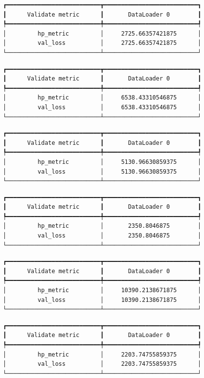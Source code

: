 \documentclass[
  letterpaper,
  DIV=11,
  numbers=noendperiod]{scrreprt}
\begin{document}
\begin{verbatim}
┏━━━━━━━━━━━━━━━━━━━━━━━━━━━┳━━━━━━━━━━━━━━━━━━━━━━━━━━━┓
┃      Validate metric      ┃       DataLoader 0        ┃
┡━━━━━━━━━━━━━━━━━━━━━━━━━━━╇━━━━━━━━━━━━━━━━━━━━━━━━━━━┩
│         hp_metric         │     2725.66357421875      │
│         val_loss          │     2725.66357421875      │
└───────────────────────────┴───────────────────────────┘
\end{verbatim}

\begin{verbatim}
┏━━━━━━━━━━━━━━━━━━━━━━━━━━━┳━━━━━━━━━━━━━━━━━━━━━━━━━━━┓
┃      Validate metric      ┃       DataLoader 0        ┃
┡━━━━━━━━━━━━━━━━━━━━━━━━━━━╇━━━━━━━━━━━━━━━━━━━━━━━━━━━┩
│         hp_metric         │     6538.43310546875      │
│         val_loss          │     6538.43310546875      │
└───────────────────────────┴───────────────────────────┘
\end{verbatim}

\begin{verbatim}
┏━━━━━━━━━━━━━━━━━━━━━━━━━━━┳━━━━━━━━━━━━━━━━━━━━━━━━━━━┓
┃      Validate metric      ┃       DataLoader 0        ┃
┡━━━━━━━━━━━━━━━━━━━━━━━━━━━╇━━━━━━━━━━━━━━━━━━━━━━━━━━━┩
│         hp_metric         │     5130.96630859375      │
│         val_loss          │     5130.96630859375      │
└───────────────────────────┴───────────────────────────┘
\end{verbatim}

\begin{verbatim}
┏━━━━━━━━━━━━━━━━━━━━━━━━━━━┳━━━━━━━━━━━━━━━━━━━━━━━━━━━┓
┃      Validate metric      ┃       DataLoader 0        ┃
┡━━━━━━━━━━━━━━━━━━━━━━━━━━━╇━━━━━━━━━━━━━━━━━━━━━━━━━━━┩
│         hp_metric         │       2350.8046875        │
│         val_loss          │       2350.8046875        │
└───────────────────────────┴───────────────────────────┘
\end{verbatim}

\begin{verbatim}
┏━━━━━━━━━━━━━━━━━━━━━━━━━━━┳━━━━━━━━━━━━━━━━━━━━━━━━━━━┓
┃      Validate metric      ┃       DataLoader 0        ┃
┡━━━━━━━━━━━━━━━━━━━━━━━━━━━╇━━━━━━━━━━━━━━━━━━━━━━━━━━━┩
│         hp_metric         │     10390.2138671875      │
│         val_loss          │     10390.2138671875      │
└───────────────────────────┴───────────────────────────┘
\end{verbatim}

\begin{verbatim}
┏━━━━━━━━━━━━━━━━━━━━━━━━━━━┳━━━━━━━━━━━━━━━━━━━━━━━━━━━┓
┃      Validate metric      ┃       DataLoader 0        ┃
┡━━━━━━━━━━━━━━━━━━━━━━━━━━━╇━━━━━━━━━━━━━━━━━━━━━━━━━━━┩
│         hp_metric         │     2203.74755859375      │
│         val_loss          │     2203.74755859375      │
└───────────────────────────┴───────────────────────────┘
\end{verbatim}
\end{document}
